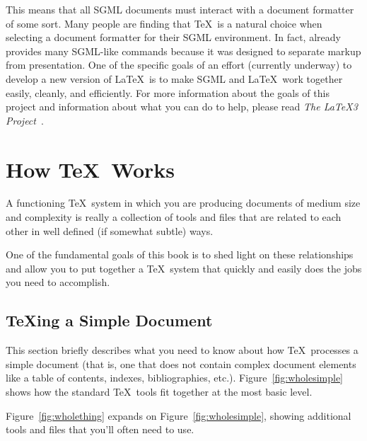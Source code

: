 This means that all SGML documents must interact with a
document formatter of some sort.  Many people are finding that \TeX\
is a natural choice when selecting a document formatter for their SGML
environment.  In fact, \ixx{\LaTeX}{latex@\LaTeX!use with SGML} 
already provides many SGML-like
commands because it was designed to separate markup from presentation.
  One of the specific goals of an effort (currently
underway) to develop a new version of \LaTeX\ is to make SGML and
\LaTeX\ work together easily, cleanly, and efficiently.  For more
information about the goals of this project and information about what
you can do to help, please read {\it The \LaTeX3 Project}~\cite{l3:project}.

\section{How \protect\TeX\ Works}
\label{sec:howtexworks}

A functioning \TeX\ system in 
which you are producing documents of
medium size and complexity is really a collection of tools and files
that are related to each other in well defined (if somewhat subtle)
ways.

One of the fundamental goals of this book is to shed light on these
relationships and allow you to put together a \TeX\ system that quickly 
and easily does the jobs you need to accomplish.

\subsection{\protect\TeX{}ing a Simple Document}

This section briefly describes what you need to know about how \TeX\
processes a simple document (that is, one that does not contain complex
document elements like a table of contents, indexes, bibliographies, etc.).
Figure~\ref{fig:wholesimple} shows how the standard \TeX\ tools fit
together at the most basic level.
\goodbreak


Figure~\ref{fig:wholething} expands on Figure~\ref{fig:wholesimple},
showing additional tools and files that you'll often need to use.

